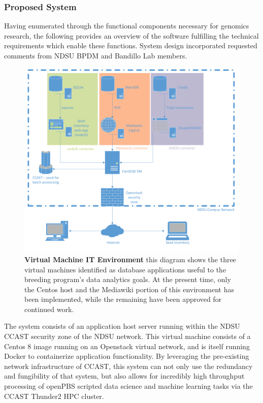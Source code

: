\documentclass[12pt, letterpaper,oneocolumn]{article}
\begin{document}
\subsubsection{Proposed System}

Having enumerated through the functional components necessary for genomics research, the following provides an overview of the software fulfilling the technical requirements which enable these functions. System design incorporated requested comments from NDSU BPDM and Bandillo Lab members.

\begin{center}
	\begin{figure}[H]
		\includegraphics[width=\linewidth]{VMProposal.png}
		\caption{\textbf{Virtual Machine IT Environment} this diagram shows the three virtual machines identified as database applications useful to the breeding program's data analytics goals. At the present time, only the Centos host and the Mediawiki portion of this environment has been implemented, while the remaining have been approved for continued work.}
	\end{figure}
\end{center}

The system consists of an application host server running within the NDSU CCAST security zone of the NDSU network. This virtual machine consists of a Centos 8 image running on an Openstack \cite{openstack} virtual network, and is itself running Docker \cite{docker} to containerize application functionality. By leveraging the pre-existing network infrastructure of CCAST, this system can not only use the redundancy and fungibility of that system, but also allows for incredibly high throughput processing of openPBS scripted data science and machine learning tasks via the CCAST Thunder2 HPC cluster.
\end{document}

